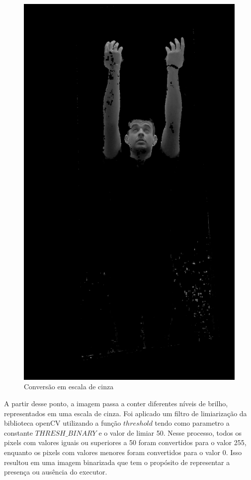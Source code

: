 \begin{figure}[!htbp]
\begin{minipage}{\sizeImg\textwidth}
            \includegraphics[width=\textwidth]{figuras/mao_barra/gray.png}
        \end{minipage}
    \caption{Conversão em escala de cinza}
    \label{fig:gray}
\end{figure}
\newpage

A partir desse ponto, a imagem passa a conter diferentes níveis de brilho, representados em uma escala de cinza. Foi aplicado um filtro de limiarização da biblioteca \ac{openCV} utilizando a função $threshold$ tendo como parametro a constante $THRESH\_BINARY$ e o valor de limiar 50. Nesse processo, todos os pixels com valores iguais ou superiores a 50 foram convertidos para o valor 255, enquanto os pixels com valores menores foram convertidos para o valor 0. Isso resultou em uma imagem binarizada que tem o propósito de representar a presença ou ausência do executor.

